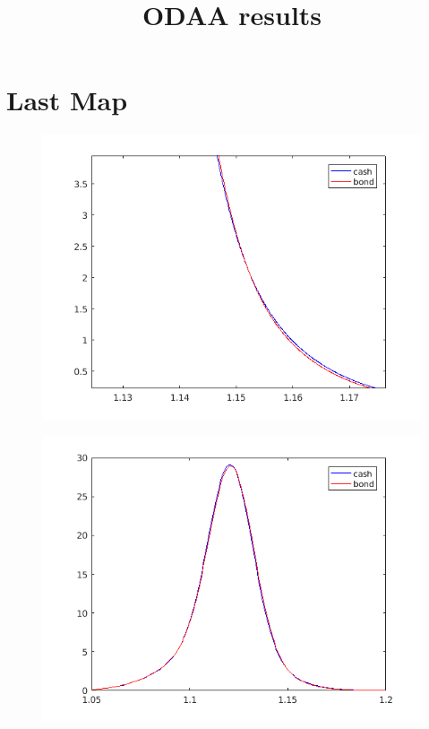 \documentclass[]{article}
\title{ODAA results}
\author{}
\begin{document}
\maketitle


\section{Last Map}
\begin{figure}[H]
	\centering
	\includegraphics[width=\textwidth]{bug1.png}
\end{figure}

\begin{figure}[H]
	\centering
	\includegraphics[width=\textwidth]{bug2.png}
\end{figure}
\end{document}
